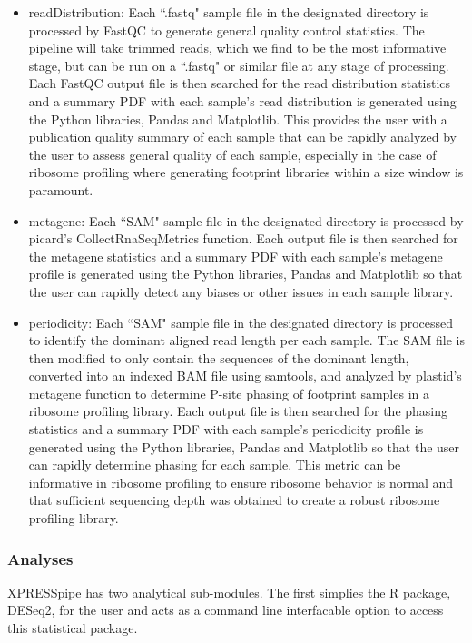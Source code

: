 \documentclass[11pt, a4paper, oneside]{article}
\begin{document}
\begin{itemize}
  \item readDistribution: Each ``.fastq" sample file in the designated directory is processed by FastQC{} to generate general quality control statistics. The pipeline will take trimmed reads, which we find to be the most informative stage, but can be run on a ``.fastq" or similar file at any stage of processing. Each FastQC output file is then searched for the read distribution statistics and a summary PDF with each sample's read distribution is generated using the Python libraries, Pandas{} and Matplotlib{}. This provides the user with a publication quality summary of each sample that can be rapidly analyzed by the user to assess general quality of each sample, especially in the case of ribosome profiling where generating footprint libraries within a size window is paramount.
  \item metagene: Each ``SAM" sample file in the designated directory is processed by picard's CollectRnaSeqMetrics function{}. Each output file is then searched for the metagene statistics and a summary PDF with each sample's metagene profile is generated using the Python libraries, Pandas{} and Matplotlib{} so that the user can rapidly detect any biases or other issues in each sample library.
  \item periodicity: Each ``SAM" sample file in the designated directory is processed to identify the dominant aligned read length per each sample. The SAM file is then modified to only contain the sequences of the dominant length, converted into an indexed BAM file using samtools{}, and analyzed by plastid's metagene function{} to determine P-site phasing of footprint samples in a ribosome profiling library. Each output file is then searched for the phasing statistics and a summary PDF with each sample's periodicity profile is generated using the Python libraries, Pandas{} and Matplotlib{} so that the user can rapidly determine phasing for each sample. This metric can be informative in ribosome profiling to ensure ribosome behavior is normal and that sufficient sequencing depth was obtained to create a robust ribosome profiling library.
\end{itemize}

\subsubsection{Analyses}
XPRESSpipe has two analytical sub-modules. The first simplies the R package, DESeq2{}, for the user and acts as a command line interfacable option to access this statistical package.
\end{document}
